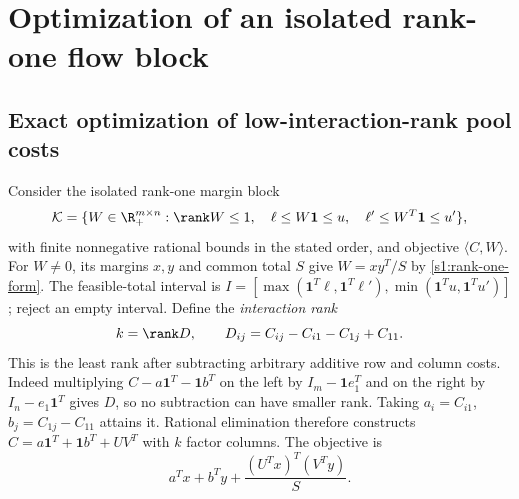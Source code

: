 \section{Optimization of an isolated rank-one flow block}\label{app:costs}

\subsection{Exact optimization of low-interaction-rank pool costs}
\label{s6:low-rank}
Consider the isolated rank-one margin block
\begin{equation}
 \mathcal K=\{W\in\R_+^{m\times n}:\rank W\le1,\quad
 \ell\le W\mathbf1\le u,\quad
 \ell'\le W^T\mathbf1\le u'\},\label{s6:margin-block}
\end{equation}
with finite nonnegative rational bounds in the stated order, and objective
$\langle C,W\rangle$. For $W\ne0$, its margins $x,y$ and common total
$S$ give $W=xy^T/S$ by \eqref{s1:rank-one-form}.
The feasible-total interval is
$I=[\max(\mathbf1^T\ell,\mathbf1^T\ell'),
\min(\mathbf1^Tu,\mathbf1^Tu')]$; reject an empty interval.
Define the \emph{interaction rank}
\[
 k=\rank D,\qquad D_{ij}=C_{ij}-C_{i1}-C_{1j}+C_{11}.
\]
This is the least rank after subtracting arbitrary additive row and
column costs. Indeed multiplying $C-a\mathbf1^T-\mathbf1b^T$ on the
left by $I_m-\mathbf1e_1^T$ and on the right by $I_n-e_1\mathbf1^T$
gives $D$, so no subtraction can have smaller rank. Taking
$a_i=C_{i1}$, $b_j=C_{1j}-C_{11}$ attains it.
Rational elimination therefore constructs
$C=a\mathbf1^T+\mathbf1b^T+UV^T$ with $k$ factor columns.
The objective is
\begin{equation}
 a^Tx+b^Ty+\frac{(U^Tx)^T(V^Ty)}S.\label{s6:interaction-objective}
\end{equation}

